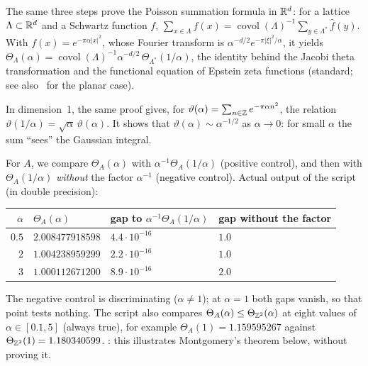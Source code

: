 \begin{uniremark}\tierL{} The same three steps prove the Poisson summation formula in $\mathbb{R}^d$: for a lattice $\Lambda\subset\mathbb{R}^d$ and a Schwartz
function $f$, $\sum_{x\in\Lambda}f(x)=\operatorname{covol}(\Lambda)^{-1}\sum_{y\in\Lambda^*}\hat f(y)$. With
$f(x)=e^{-\pi\alpha|x|^2}$, whose Fourier transform is $\alpha^{-d/2}e^{-\pi|\xi|^2/\alpha}$, it yields
$\Theta_\Lambda(\alpha)=\operatorname{covol}(\Lambda)^{-1}\alpha^{-d/2}\,\Theta_{\Lambda^*}(1/\alpha)$, the identity behind the Jacobi theta
transformation and the functional equation of Epstein zeta functions (standard; see also~\cite{montgomery} for the planar case).
\end{uniremark}

\begin{example}\label{ch1:ex:jacobi}
In dimension~1, the same proof gives, for $\vartheta(\alpha)=\sum_{n\in\mathbb{Z}}e^{-\pi\alpha n^2}$, the relation
$\vartheta(1/\alpha)=\sqrt\alpha\,\vartheta(\alpha)$. It shows that $\vartheta(\alpha)\sim\alpha^{-1/2}$ as $\alpha\to0$: for small $\alpha$ the sum
``sees'' the Gaussian integral. \tierC{}
\end{example}

\begin{numbox}
For $A$, we compare $\Theta_A(\alpha)$ with $\alpha^{-1}\Theta_A(1/\alpha)$ (positive control), and then with $\Theta_A(1/\alpha)$ \emph{without} the factor
$\alpha^{-1}$ (negative control). Actual output of the script (in double precision):
\begin{center}\small
\begin{tabular}{@{}rlll@{}}
\toprule
$\alpha$ & $\Theta_A(\alpha)$ & gap to $\alpha^{-1}\Theta_A(1/\alpha)$ & gap without the factor \\
\midrule
$0.5$ & $2.008477918598$ & $4.4\cdot10^{-16}$ & $1.0$ \\
$2$ & $1.004238959299$ & $2.2\cdot10^{-16}$ & $1.0$ \\
$3$ & $1.000112671200$ & $8.9\cdot10^{-16}$ & $2.0$ \\
\bottomrule
\end{tabular}
\end{center}
The negative control is discriminating ($\alpha\neq1$); at $\alpha=1$ both gaps vanish, so that point tests nothing.
The script also compares $\Theta_A(\alpha)\le\Theta_{\mathbb{Z}^2}(\alpha)$ at eight values of $\alpha\in[0.1, 5]$ (always true), for example
$\Theta_A(1)=1.159595267$ against $\Theta_{\mathbb{Z}^2}(1)=1.180340599$. \tierX{}: this illustrates Montgomery's theorem below, without proving it.
\end{numbox}

